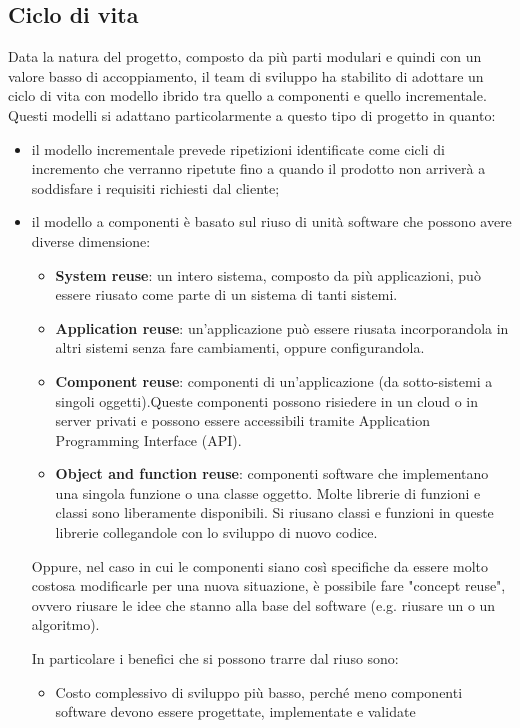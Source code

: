 	\subsection{Ciclo di vita} %
	Data la natura del progetto, composto da più parti modulari e quindi con un valore basso di accoppiamento, il team di sviluppo ha stabilito di adottare un ciclo di vita con modello ibrido tra quello a componenti e quello incrementale.
	Questi modelli si adattano particolarmente a questo tipo di progetto in quanto:
	\begin{itemize}
		\item il modello incrementale prevede ripetizioni identificate come cicli di incremento che verranno ripetute fino a quando il prodotto non arriverà a soddisfare i requisiti richiesti dal cliente;
		\item il modello a componenti è basato sul riuso di unità software che possono avere diverse dimensione:
		\begin{itemize}
			\item \textbf{System reuse}: un intero sistema, composto da più applicazioni, può essere riusato come parte di un sistema di tanti sistemi.
			\item \textbf{Application reuse}: un'applicazione può essere riusata incorporandola in altri sistemi senza fare cambiamenti, oppure configurandola.
			\item \textbf{Component reuse}: componenti di un'applicazione (da sotto-sistemi a singoli oggetti).Queste componenti possono risiedere in un cloud o in server privati e possono essere accessibili tramite Application Programming Interface (API). 
			\item \textbf{Object and function reuse}: componenti software che implementano una singola funzione o una classe oggetto. Molte librerie di funzioni e classi sono liberamente disponibili. Si riusano classi e funzioni in queste librerie collegandole con lo sviluppo di nuovo codice.
		\end{itemize}
		Oppure, nel caso in cui le componenti siano così specifiche da essere molto costosa modificarle per una nuova situazione, è possibile fare "concept reuse", ovvero riusare le idee che stanno alla base del software (e.g. riusare un  o un algoritmo). \par
		In particolare i benefici che si possono trarre dal riuso sono:
		\begin{itemize}
			\item Costo complessivo di sviluppo più basso, perché meno componenti software devono essere progettate, implementate e validate

\end{itemize}
\end{itemize}
